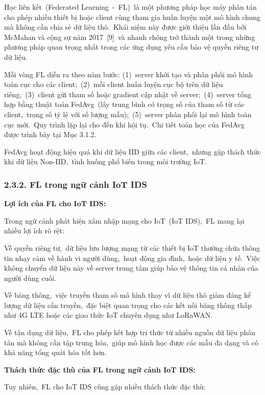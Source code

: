 Học liên kết~(Federated Learning~-~FL)~là một phương pháp học máy phân tán cho phép nhiều thiết bị hoặc client cùng tham gia huấn luyện một mô hình chung mà không cần chia sẻ dữ liệu thô.~Khái niệm này được giới thiệu lần đầu bởi McMahan và cộng sự năm 2017~{[}9{]}~và nhanh chóng trở thành một trong những phương pháp quan trọng nhất trong các ứng dụng yêu cầu bảo vệ quyền riêng tư dữ liệu.

Mỗi vòng FL diễn ra theo năm bước: (1)~server khởi tạo và phân phối mô hình toàn cục cho các client;~(2)~mỗi client huấn luyện cục bộ trên dữ liệu riêng;~(3)~client gửi tham số hoặc gradient cập nhật về server;~(4)~server tổng hợp bằng thuật toán FedAvg~(lấy trung bình có trọng số của tham số từ các client,~trọng số tỷ lệ với số lượng mẫu);~(5)~server phân phối lại mô hình toàn cục mới.~Quy trình lặp lại cho đến khi hội tụ.~Chi tiết toán học của FedAvg được trình bày tại Mục 3.1.2.

FedAvg hoạt động hiệu quả khi dữ liệu IID giữa các client,~nhưng gặp thách thức khi dữ liệu Non-IID,~tình huống phổ biến trong môi trường IoT.

\subsubsection{2.3.2. FL trong ngữ cảnh IoT IDS}\label{fl-trong-ngux1eef-cux1ea3nh-iot-ids}

\textbf{Lợi ích của FL cho IoT IDS:}

Trong ngữ cảnh phát hiện xâm nhập mạng cho IoT~(IoT IDS),~FL mang lại nhiều lợi ích rõ rệt:

Về quyền riêng tư,~dữ liệu lưu lượng mạng từ các thiết bị IoT thường chứa thông tin nhạy cảm về hành vi người dùng,~hoạt động gia đình,~hoặc dữ liệu y tế.~Việc không chuyển dữ liệu này về server trung tâm giúp bảo vệ thông tin cá nhân của người dùng cuối.

Về băng thông,~việc truyền tham số mô hình thay vì dữ liệu thô giảm đáng kể lượng dữ liệu cần truyền,~đặc biệt quan trọng cho các kết nối băng thông thấp như 4G LTE hoặc các giao thức IoT chuyên dụng như LoRaWAN.

Về tận dụng dữ liệu,~FL cho phép kết hợp tri thức từ nhiều nguồn dữ liệu phân tán mà không cần tập trung hóa,~giúp mô hình học được các mẫu đa dạng và có khả năng tổng quát hóa tốt hơn.

\textbf{Thách thức đặc thù của FL trong ngữ cảnh IoT IDS:}

Tuy nhiên,~FL cho IoT IDS cũng gặp nhiều thách thức đặc thù:

